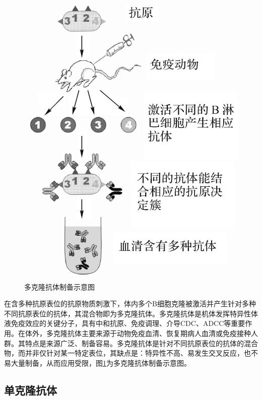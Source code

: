 \begin{figure}[!htbp]
 \centering
 \includegraphics{./images/Image00072.jpg}
 \captionsetup{justification=centering}
 \caption{多克隆抗体制备示意图}
 \label{fig4-12}
  \end{figure} 

在含多种抗原表位的抗原物质刺激下，体内多个B细胞克隆被激活并产生针对多种不同抗原表位的抗体，其混合物即为多克隆抗体。多克隆抗体是机体发挥特异性体液免疫效应的关键分子，具有中和抗原、免疫调理、介导CDC、ADCC等重要作用。在体外，多克隆抗体主要来源于动物免疫血清、恢复期病人血清或免疫接种人群。其特点是来源广泛、制备容易。多克隆抗体是针对不同抗原表位的抗体的混合物，而并非仅针对某一特定表位，其缺点是：特异性不高、易发生交叉反应，也不易大量制备，从而应用受限，图\ref{fig4-12}为多克隆抗体制备示意图。


\subsection{单克隆抗体}

